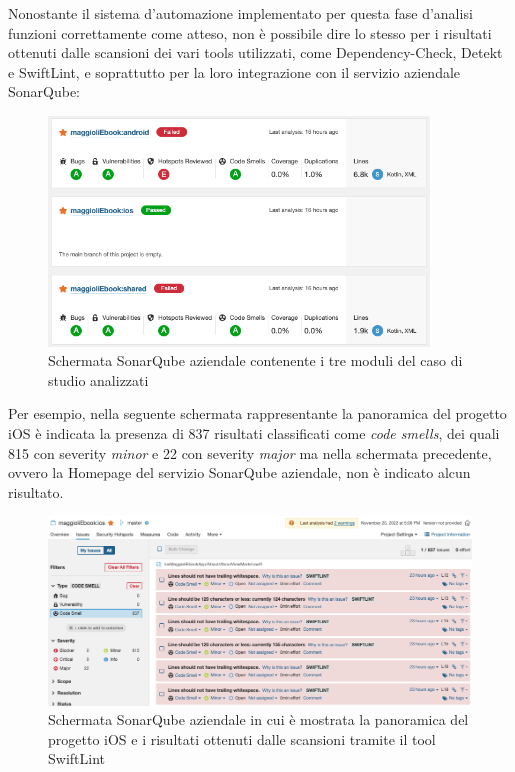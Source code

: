 Nonostante il sistema d'automazione implementato per questa fase d'analisi funzioni correttamente come atteso, 
non è possibile dire lo stesso per i risultati ottenuti dalle scansioni dei vari tools utilizzati, 
come Dependency-Check, 
Detekt e SwiftLint, 
e soprattutto per la loro integrazione con il servizio aziendale SonarQube:

\begin{figure}[H]
\centering
    \includegraphics[width=0.9\textwidth]{img/sonarqube-kmm.png}
    \caption{Schermata SonarQube aziendale contenente i tre moduli del caso di studio analizzati}
    \label{sonarqube-kmm}
\end{figure}

Per esempio, 
nella seguente schermata rappresentante la panoramica del progetto iOS è indicata la presenza di 837 risultati classificati come \textit{code smells},
dei quali 815 con severity \textit{minor} e 22 con severity \textit{major} ma nella schermata precedente, 
ovvero la Homepage del servizio SonarQube aziendale, 
non è indicato alcun risultato.

\begin{figure}[H]
\centering
    \includegraphics[width=1\textwidth]{img/sonarqube-ios.png}
    \caption{Schermata SonarQube aziendale in cui è mostrata la panoramica del progetto iOS e i risultati ottenuti dalle scansioni tramite il tool SwiftLint}
    \label{sonarqube-ios}
\end{figure}

